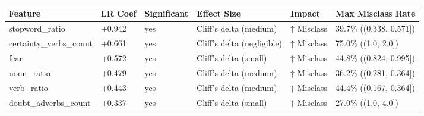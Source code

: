 \begin{tabular}{llllll}
\toprule
Feature & LR Coef & Significant & Effect Size & Impact & Max Misclass Rate \\
\midrule
stopword\_ratio & +0.942 & yes & Cliff's delta (medium) & ↑ Misclass & 39.7\% ((0.338, 0.571]) \\
certainty\_verbs\_count & +0.661 & yes & Cliff's delta (negligible) & ↑ Misclass & 75.0\% ((1.0, 2.0]) \\
fear & +0.572 & yes & Cliff's delta (small) & ↑ Misclass & 44.8\% ((0.824, 0.995]) \\
noun\_ratio & +0.479 & yes & Cliff's delta (medium) & ↑ Misclass & 36.2\% ((0.281, 0.364]) \\
verb\_ratio & +0.443 & yes & Cliff's delta (medium) & ↑ Misclass & 44.4\% ((0.167, 0.364]) \\
doubt\_adverbs\_count & +0.337 & yes & Cliff's delta (small) & ↑ Misclass & 27.0\% ((1.0, 4.0]) \\
\bottomrule
\end{tabular}
